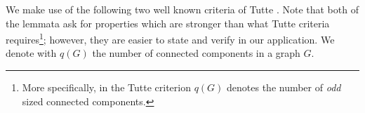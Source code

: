 \documentclass[11pt]{article}
\begin{document}

  


We make use of the following two well known criteria of Tutte \cite{tutte1952factors, tutte1947factorization}. 
Note that both of the lemmata ask for properties which are stronger than what Tutte criteria requires\footnote{More specifically, in the Tutte criterion $q(G)$ denotes the number of \emph{odd} sized connected components.}; however, they are easier to state and verify in our application. We denote with $q(G)$ the number of connected components in a graph $G$.
\end{document}
